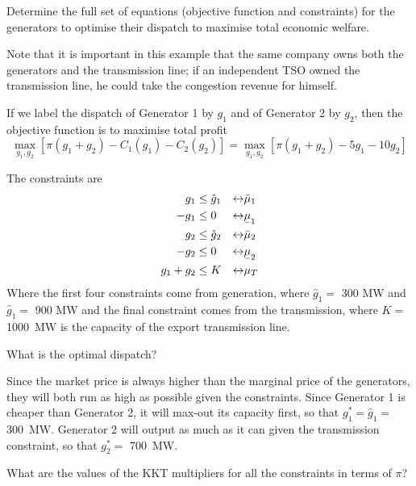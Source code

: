 \documentclass[11pt,a4paper,fleqn]{scrartcl}
\def\m{\mu}
\newcommand{\ubar}[1]{\text{\b{$#1$}}}
\begin{document}
\begin{enumerate}[(a)]
 \begin{shaded}\item Determine the full set of equations (objective function and
  constraints) for the generators to optimise their dispatch to
  maximise total economic welfare.\end{shaded}

 Note that it is important in this example that the same company owns
 both the generators and the transmission line; if an independent TSO
 owned the transmission line, he could take the congestion revenue for
 himself.

 If we label the dispatch of Generator 1 by $g_1$ and of Generator 2 by $g_2$, then the objective function is to maximise total profit
 \begin{equation*}
  \max_{g_1,g_2} \left[ \pi (g_1+g_2) - C_1(g_1) - C_2(g_2) \right] =    \max_{g_1,g_2} \left[ \pi (g_1+g_2) - 5g_1 - 10g_2 \right]
 \end{equation*}

 The constraints are
 \begin{align*}
  g_1     & \leq \hat g_1 & \leftrightarrow & \bar{\m}_1  \\
  -g_1    & \leq 0        & \leftrightarrow & \ubar{\m}_1 \\
  g_2     & \leq \hat g_2 & \leftrightarrow & \bar{\m}_2  \\
  -g_2    & \leq 0        & \leftrightarrow & \ubar{\m}_2 \\
  g_1+g_2 & \leq K        & \leftrightarrow & \m_T
 \end{align*}
 Where the first four constraints come from generation, where $\hat g_1 = $ 300 MW and $\hat g_1 = $ 900 MW and the final constraint comes from the transmission, where $K = $ 1000~MW is the capacity of the export transmission line.

 \begin{shaded}\item What is the optimal dispatch?\end{shaded}

 Since the market price is always higher than the marginal price
 of the generators, they will both run as high as possible given the
 constraints. Since Generator 1 is cheaper than Generator 2, it will
 max-out its capacity first, so that $g_1^* = \hat g_1 =$ 300~MW. Generator 2 will output as much as it can given the transmission constraint, so that $g_2^* =$ 700~MW.

 \begin{shaded}\item What are the values of the KKT multipliers for all the constraints in terms of $\pi$?\end{shaded}


\end{enumerate}
\end{document}
